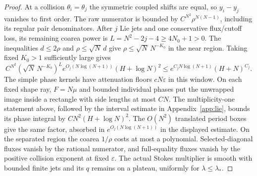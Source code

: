 \documentclass[11pt]{article}
\numberwithin{equation}{section}
\theoremstyle{definition}
\newcommand{\eps}{\varepsilon}
\begin{document}
\begin{proof}
At a collision \(\theta_i=\theta_j\) the symmetric coupled shifts
are equal, so \(y_i-y_j\) vanishes to first order. The raw numerator
is bounded by \(C^{N^2}\rho^{N(N-1)}\), including its regular pair
denominators. After \(j\) Lie jets and one conservative flux/cutoff
loss, its remaining coarea power is
\(L=N^2-2j-4\ge4N_0+1>0\).
The inequalities \(d\le2\rho\) and \(\rho\le\sqrt N\,d\) give
\(\rho\le\sqrt N\,N^{-K_0}\) in the near region.
Taking fixed \(K_0>1\) sufficiently large gives
\[
 C^{N^2}(\sqrt N\,N^{-K_0})^L
      e^{O_j(N\log(N+1))}(H+\log N)^2
 \le e^{C_jN\log(N+1)}(H+N)^{C_j}.
\]
The simple phase kernels have attenuation floors \(cN\eps\) in
this window. On each fixed shape ray, \(F=N\mu\) and bounded individual
phases put the unwrapped image inside a rectangle with side lengths
at most \(CN\). The multiplicity-one statement above, followed by
the interval estimate in Appendix~\ref{app:lie}, bounds its phase
integral by \(CN^2(H+\log N)^2\). The \(O(N^2)\) translated
period boxes give the same factor, absorbed in
\(e^{O_j(N\log(N+1))}\) in the displayed estimate.
On the separated region the coarea \(1/\rho\) costs at most a
polynomial.
Selected-diagonal fluxes vanish by the rational numerator, and
full-equality fluxes vanish by the positive collision exponent at
fixed \(\eps\). The actual Stokes multiplier is smooth with bounded
finite jets and its \(q\) remains on a plateau, uniformly for
\(\lambda\le\lambda_*\).
\end{proof}
\end{document}
